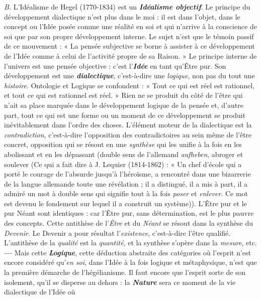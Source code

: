 
{\it B.} L'Idéalisme de Hegel (1770-1834) est un \textbf{\textit {Idéalisme objectif}}.
Le principe du développement dialectique n’est plus dans le moi :
il est dans l’objet, dans le concept ou l’Idée posée comme une réalité
en soi et qui n’arrive à la conscience de soi que par son propre développement
interne. Le sujet n’est que le témoin passif de ce mouvement :
« La pensée subjective se borne à assister à ce développement
de l’Idée comme à celui de l’activité propre de sa Raison. » Le principe
interne de l’univers est une pensée objective : c’est l’\textbf{\textit {Idée}} en tant
qu’Être pur. Son développement est une \textbf{\textit {dialectique}}, c’est-à-dire
une {\it logique}, non pas du tout une {\it histoire}. Ontologie et Logique se
confondent : « Tout ce qui est réel est rationnel, et tout ce qui est
rationnel est réel. » Rien ne se produit du côté de l’être qui n’ait sa place
marquée dans le développement logique de la pensée et, d’autre part,
tout ce qui est une forme ou un moment de ce développement se
produit inévitablement dans l’ordre des choses. L'élément moteur
de la dialectique est la {\it contradiction}, c’est-à-dire l'opposition des
contradictoires au sein même de l’être concret, opposition qui se
résout en une {\it synthèse} qui les unifie à la fois en les abolissant et en
les dépassant (double sens de l'allemand {\it aufheben}, abroger et soulever
{\scriptsize (Ce qui a fait dire à J. Lequier (1814-1862) : « Un chef d'école qui a porté le courage
de l'absurde jusqu'à l’héroïsme, a rencontré dans une bizarrerie de la langue allemande
toute une révélation ; il a distingué, il a mis à part, il a admiré un mot à double sens
qui signifie tout à la fois {\it poser} et {\it enlever}. Ce mot est devenu le fondement sur lequel il a
construit un système)}).
L’Être pur et le pur Néant sont identiques : car l'Être pur,
sans détermination, est le plus pauvre des concepts. Cette antithèse
de l’{\it Être} et du {\it Néant} se résout dans la synthèse du {\it Devenir}. Le Devenir
a pour résultat l'{\it existence}, c’est-à-dire l'être qualifié. L’antithèse de
la {\it qualité} est la {\it quantité}, et la synthèse s’opère dans la {\it mesure}, etc. {\bf —}
Mais cette \textbf{\textit {Logique}}, cette déduction abstraite des catégories où
l'esprit n’est encore considéré qu’{\it en soi}, dans l’Idée à la fois logique
et métaphysique, n’est que la première démarche de l’hégélianisme.
Il faut encore que l’esprit sorte de son isolement, qu’il se disperse au
dehors : la \textbf{\textit {Nature}} sera ce moment de la vie dialectique de l’Idée où
